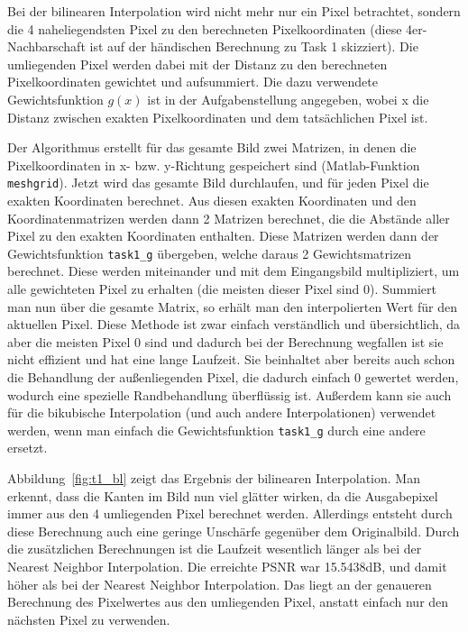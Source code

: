 Bei der bilinearen Interpolation wird nicht mehr nur ein Pixel betrachtet, sondern die 4 naheliegendsten Pixel zu den berechneten Pixelkoordinaten (diese 4er-Nachbarschaft ist auf der händischen Berechnung zu Task 1 skizziert). Die umliegenden Pixel werden dabei mit der Distanz zu den berechneten Pixelkoordinaten gewichtet und aufsummiert. Die dazu verwendete Gewichtsfunktion $g(x)$ ist in der Aufgabenstellung angegeben, wobei x die Distanz zwischen exakten Pixelkoordinaten und dem tatsächlichen Pixel ist.

Der Algorithmus erstellt für das gesamte Bild zwei Matrizen, in denen die Pixelkoordinaten in x- bzw. y-Richtung gespeichert sind (Matlab-Funktion \texttt{meshgrid}). Jetzt wird das gesamte Bild durchlaufen, und für jeden Pixel die exakten Koordinaten berechnet. Aus diesen exakten Koordinaten und den Koordinatenmatrizen werden dann 2 Matrizen berechnet, die die Abstände aller Pixel zu den exakten Koordinaten enthalten. Diese Matrizen werden dann der Gewichtsfunktion \texttt{task1\_g} übergeben, welche daraus 2 Gewichtsmatrizen berechnet. Diese werden miteinander und mit dem Eingangsbild multipliziert, um alle gewichteten Pixel zu erhalten (die meisten dieser Pixel sind 0). Summiert man nun über die gesamte Matrix, so erhält man den interpolierten Wert für den aktuellen Pixel.
Diese Methode ist zwar einfach verständlich und übersichtlich, da aber die meisten Pixel 0 sind und dadurch bei der Berechnung wegfallen ist sie nicht effizient und hat eine lange Laufzeit. Sie beinhaltet aber bereits auch schon die Behandlung der außenliegenden Pixel, die dadurch einfach 0 gewertet werden, wodurch eine spezielle Randbehandlung überflüssig ist. Außerdem kann sie auch für die bikubische Interpolation (und auch andere Interpolationen) verwendet werden, wenn man einfach die Gewichtsfunktion \texttt{task1\_g} durch eine andere ersetzt.


\smallskip

Abbildung~\ref{fig:t1_bl} zeigt das Ergebnis der bilinearen Interpolation. Man erkennt, dass die Kanten im Bild nun viel glätter wirken, da die Ausgabepixel immer aus den 4 umliegenden Pixel berechnet werden. Allerdings entsteht durch diese Berechnung auch eine geringe Unschärfe gegenüber dem Originalbild. Durch die zusätzlichen Berechnungen ist die Laufzeit wesentlich länger als bei der Nearest Neighbor Interpolation. Die erreichte PSNR war 15.5438dB, und damit höher als bei der Nearest Neighbor Interpolation. Das liegt an der genaueren Berechnung des Pixelwertes aus den umliegenden Pixel, anstatt einfach nur den nächsten Pixel zu verwenden.

